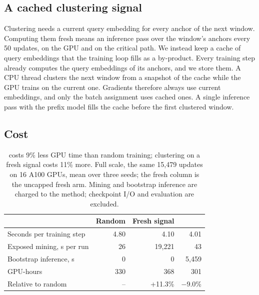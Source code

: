 \subsection{A cached clustering signal}
\label{sec:method:cache}

Clustering needs a current query embedding for every anchor of the next window. Computing them fresh means an
inference pass over the window's anchors every 50 updates, on the GPU and on the critical path. We instead keep a
cache of query embeddings that the training loop fills as a by-product. Every training step already computes the query
embeddings of its anchors, and we store them. A CPU thread clusters the next window from a snapshot of the cache while
the GPU trains on the current one. Gradients therefore always use current embeddings, and only the batch assignment
uses cached ones. A single inference pass with the prefix model fills the cache before the first clustered window.

\subsection{Cost}
\label{sec:method:cost}

\begin{table}[t]
  \caption{\ours{} costs 9\% less GPU time than random training; clustering on a fresh signal costs 11\% more. Full
  scale, the same 15{,}479 updates on 16 A100 GPUs, mean over three seeds; the fresh column is the uncapped fresh arm.
  Mining and bootstrap inference are charged to the method; checkpoint I/O and evaluation are excluded.}
  \label{tab:cost}
  \footnotesize\setlength{\tabcolsep}{4pt}
  \begin{tabular}{lrrr}
    \toprule
    & Random & Fresh signal & \ours{} \\
    \midrule
    Seconds per training step & 4.80 & 4.10 & 4.01 \\
    Exposed mining, s per run & 26 & 19{,}221 & 43 \\
    Bootstrap inference, s & 0 & 0 & 5{,}459 \\
    GPU-hours & 330 & 368 & 301 \\
    Relative to random & -- & +11.3\% & $-$9.0\% \\
    \bottomrule
  \end{tabular}
\end{table}

